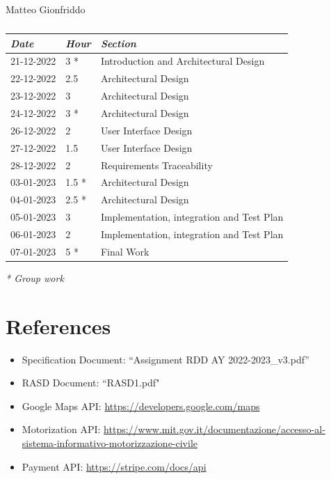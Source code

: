\documentclass[a4paper]{report}
\begin{document}
\begin{table}[H]
\centering

Matteo Gionfriddo\\
\begin{tabular}{p{2cm}p{1.5cm}p{7cm}}
\toprule
\textit{Date} & \textit{Hour} & \textit{Section} \\ \midrule
21-12-2022 & 3 * & Introduction and Architectural Design \\ \midrule
22-12-2022 & 2.5 &  Architectural Design\\ \midrule
23-12-2022 & 3 &  Architectural Design\\ \midrule
24-12-2022 & 3 * & Architectural Design \\ \midrule
26-12-2022 & 2 & User Interface Design \\ \midrule
27-12-2022 & 1.5 & User Interface Design \\ \midrule
28-12-2022 & 2 & Requirements Traceability \\ \midrule
03-01-2023 & 1.5 * & Architectural Design \\ \midrule
04-01-2023 & 2.5 * & Architectural Design \\  \midrule
05-01-2023 & 3 & Implementation, integration and Test Plan \\  \midrule
06-01-2023 & 2 & Implementation, integration and Test Plan \\ \midrule
07-01-2023 & 5 * & Final Work \\ \midrule

\bottomrule
\end{tabular}
\caption[Matteo Gionfriddo's effort table]{}
\end{table}
\textit{* Group work}
\chapter{References}
\begin{itemize}
\item Specification Document: “Assignment RDD AY 2022-2023\_v3.pdf”
\item RASD Document: “RASD1.pdf"
\item Google Maps API: \href{https://developers.google.com/maps}{https://developers.google.com/maps}
\item Motorization API: \href{https://www.mit.gov.it/documentazione/accesso-al-sistema-informativo-motorizzazione-civile}{https://www.mit.gov.it/documentazione/accesso-al-sistema-informativo-motorizzazione-civile}
\item Payment API: \href{https://stripe.com/docs/api}{https://stripe.com/docs/api}
\end{itemize}
\end{document}
